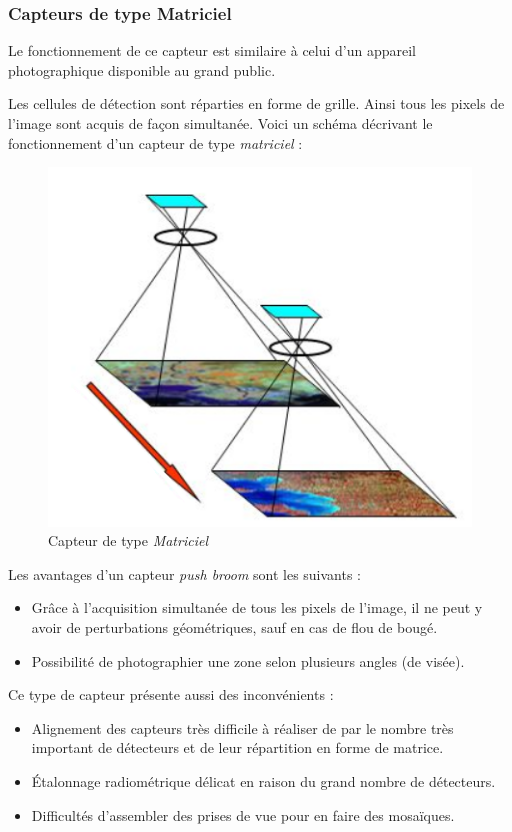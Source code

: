 \documentclass[a4paper, 11pt]{report}
\begin{document}
\subsubsection{Capteurs de type Matriciel}
Le fonctionnement de ce capteur est similaire à celui d'un appareil photographique disponible au grand public.

Les cellules de détection sont réparties en forme de grille. Ainsi tous les pixels de l'image sont acquis de façon simultanée.
Voici un schéma décrivant le fonctionnement d'un capteur de type \emph{matriciel} :
\begin{figure}[H]
	\begin{center}
		\includegraphics[scale=0.7]{Images/CCD_Sensor.png}
		\caption{Capteur de type \emph{Matriciel}}
	\end{center}
\end{figure}

Les avantages d'un capteur \emph{push broom} sont les suivants :
\begin{itemize}
	\item Grâce à l'acquisition simultanée de tous les pixels de l'image, il ne peut y avoir de perturbations géométriques, sauf en cas de flou de bougé.
	\item Possibilité de photographier une zone selon plusieurs angles (de visée).
\end{itemize}
Ce type de capteur présente aussi des inconvénients :
\begin{itemize}
	\item Alignement des capteurs très difficile à réaliser de par le nombre très important de détecteurs et de leur répartition en forme de matrice.
	\item Étalonnage radiométrique délicat en raison du grand nombre de détecteurs.
	\item Difficultés d'assembler des prises de vue pour en faire des mosaïques.
\end{itemize}
\end{document}
